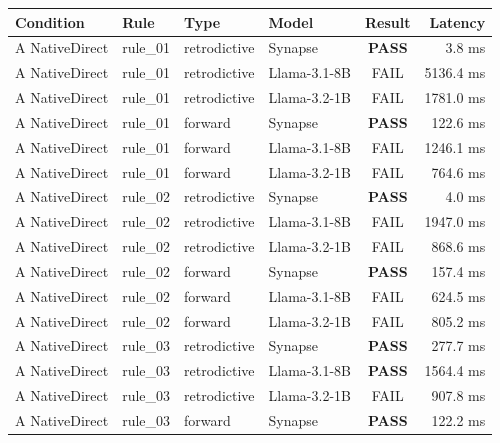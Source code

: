 {\scriptsize\sffamily\renewcommand{\arraystretch}{0.88}
\setlength{\tabcolsep}{3.5pt}
\noindent\begin{longtable}{p{2.2cm} p{1.2cm} p{2.0cm} p{3.8cm} c r}
\toprule
\textbf{\color{brandnavy}Condition} & \textbf{\color{brandnavy}Rule} & \textbf{\color{brandnavy}Type} & \textbf{\color{brandnavy}Model} & \textbf{\color{brandnavy}Result} & \textbf{\color{brandnavy}Latency} \\
\midrule
\endhead
\bottomrule
\endfoot
A NativeDirect & rule\_01 & retrodictive & Synapse & \textbf{\color{passgreen}PASS} & 3.8 ms \\
A NativeDirect & rule\_01 & retrodictive & Llama-3.1-8B & \color{gray}FAIL & 5136.4 ms \\
A NativeDirect & rule\_01 & retrodictive & Llama-3.2-1B & \color{gray}FAIL & 1781.0 ms \\
A NativeDirect & rule\_01 & forward & Synapse & \textbf{\color{passgreen}PASS} & 122.6 ms \\
A NativeDirect & rule\_01 & forward & Llama-3.1-8B & \color{gray}FAIL & 1246.1 ms \\
A NativeDirect & rule\_01 & forward & Llama-3.2-1B & \color{gray}FAIL & 764.6 ms \\
A NativeDirect & rule\_02 & retrodictive & Synapse & \textbf{\color{passgreen}PASS} & 4.0 ms \\
A NativeDirect & rule\_02 & retrodictive & Llama-3.1-8B & \color{gray}FAIL & 1947.0 ms \\
A NativeDirect & rule\_02 & retrodictive & Llama-3.2-1B & \color{gray}FAIL & 868.6 ms \\
A NativeDirect & rule\_02 & forward & Synapse & \textbf{\color{passgreen}PASS} & 157.4 ms \\
A NativeDirect & rule\_02 & forward & Llama-3.1-8B & \color{gray}FAIL & 624.5 ms \\
A NativeDirect & rule\_02 & forward & Llama-3.2-1B & \color{gray}FAIL & 805.2 ms \\
A NativeDirect & rule\_03 & retrodictive & Synapse & \textbf{\color{passgreen}PASS} & 277.7 ms \\
A NativeDirect & rule\_03 & retrodictive & Llama-3.1-8B & \textbf{\color{passgreen}PASS} & 1564.4 ms \\
A NativeDirect & rule\_03 & retrodictive & Llama-3.2-1B & \color{gray}FAIL & 907.8 ms \\
A NativeDirect & rule\_03 & forward & Synapse & \textbf{\color{passgreen}PASS} & 122.2 ms \\

\end{longtable}}
